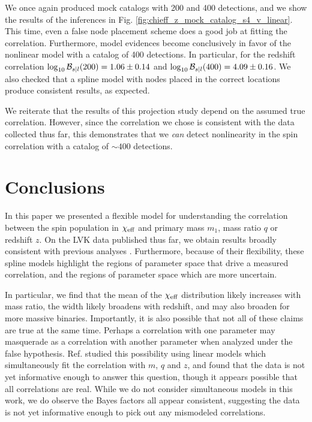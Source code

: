 \begin{refsection}
We once again produced mock catalogs with 200 and 400 detections, and we show the results of the inferences in Fig. \ref{fig:chieff_z_mock_catalog_s4_v_linear}. This time, even a false node placement scheme does a good job at fitting the correlation. Furthermore, model evidences become conclusively in favor of the nonlinear model with a catalog of 400 detections. In particular, for the redshift correlation $\log_{\rm 10}\mathcal{B}_{s|l}(200) = 1.06 \pm 0.14$ and $\log_{\rm 10}\mathcal{B}_{s|l}(400) = 4.09 \pm 0.16$.
We also checked that a spline model with nodes placed in the correct locations produce consistent results, as expected.

We reiterate that the results of this projection study depend on the assumed true correlation. However, since the correlation we chose is consistent with the data collected thus far, this demonstrates that we \textit{can} detect nonlinearity in the spin correlation with a catalog of $\sim400$ detections. 

\section{Conclusions}
\label{sec: spline conclusion}
In this paper we presented a flexible model for understanding the correlation between the spin population in $\chi_{\rm eff}$ and primary mass $m_1$, mass ratio $q$ or redshift $z$. On the \ac{LVK} data published thus far, we obtain results broadly consistent with previous analyses \cite{Safarzadeh:2020mlb,Callister:2021fpo,KAGRA:2021duu,Biscoveanu:2022qac,Franciolini:2022iaa}. Furthermore, because of their flexibility, these spline models highlight the regions of parameter space that drive a measured correlation, and the regions of parameter space which are more uncertain. %

In particular, we find that the mean of the $\chi_{\rm eff}$ distribution likely increases with mass ratio, the width likely broadens with redshift, and may also broaden for more massive binaries. Importantly, it is also possible that not all of these claims are true at the same time. Perhaps a correlation with one parameter may masquerade as a correlation with another parameter when analyzed under the false hypothesis. Ref. \cite{Biscoveanu:2022qac} studied this possibility using linear models which simultaneously fit the correlation with $m$, $q$ and $z$, and found that the data is not yet informative enough to answer this question, though it appears possible that all correlations are real. While we do not consider simultaneous models in this work, we do observe the Bayes factors all appear consistent, suggesting the data is not yet informative enough to pick out any mismodeled correlations.
 

\end{refsection}
